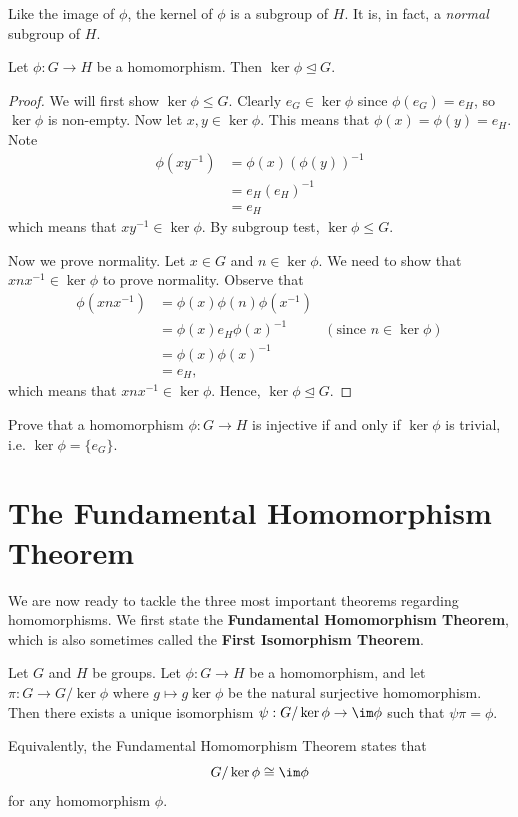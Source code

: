 Like the image of $\phi$, the kernel of $\phi$ is a subgroup of $H$. It is, in fact, a \textit{normal} subgroup of $H$.
\begin{proposition}\label{prop-kernel-is-normal-subgroup-of-domain}
    Let $\phi: G \to H$ be a homomorphism. Then $\ker\phi \unlhd G$.
\end{proposition}
\begin{proof}
    We will first show $\ker\phi\leq G$. Clearly $e_G \in \ker\phi$ since $\phi(e_G) = e_H$, so $\ker\phi$ is non-empty. Now let $x, y \in \ker\phi$. This means that $\phi(x) = \phi(y) = e_H$. Note
    \begin{align*}
        \phi(xy^{-1}) &= \phi(x)\left(\phi(y)\right)^{-1}\\
        &= e_H(e_H)^{-1}\\
        &= e_H
    \end{align*}
    which means that $xy^{-1}\in\ker\phi$. By subgroup test, $\ker\phi\leq G$.

    Now we prove normality. Let $x \in G$ and $n \in \ker\phi$. We need to show that $xnx^{-1}\in\ker\phi$ to prove normality. Observe that
    \begin{align*}
        \phi(xnx^{-1}) &= \phi(x)\phi(n)\phi(x^{-1})\\
        &= \phi(x)e_H\phi(x)^{-1} & (\text{since } n \in \ker\phi)\\
        &= \phi(x)\phi(x)^{-1}\\
        &= e_H,
    \end{align*}
    which means that $xnx^{-1} \in \ker\phi$. Hence, $\ker\phi \unlhd G$.
\end{proof}

\begin{exercise}\label{exercise-trivial-kernel-means-injective}
    Prove that a homomorphism $\phi:G\to H$ is injective if and only if $\ker \phi$ is trivial, i.e. $\ker \phi = \{e_G\}$.
\end{exercise}

\section{The Fundamental Homomorphism Theorem}
We are now ready to tackle the three most important theorems regarding homomorphisms. We first state the \textbf{Fundamental Homomorphism Theorem}, which is also sometimes called the \textbf{First Isomorphism Theorem}.
\begin{theorem}\label{thrm-isomorphism-1}
    Let $G$ and $H$ be groups. Let $\phi: G \to H$ be a homomorphism, and let $\pi: G \to G/\ker\phi$ where $g\mapsto g\ker\phi$ be the natural surjective homomorphism. Then there exists a unique isomorphism $\psi: G/\ker\phi \to \im\phi$ such that $\psi\pi = \phi$.
\end{theorem}
Equivalently, the Fundamental Homomorphism Theorem states that
\[
    G/\ker\phi \cong \im\phi
\]
for any homomorphism $\phi$.

